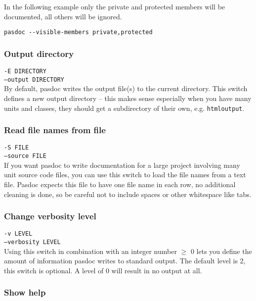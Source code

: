\documentclass[11pt]{article}
\begin{document}
In the following example only the private and protected members
will be documented, all others will be ignored.

\begin{verbatim}
pasdoc --visible-members private,protected
\end{verbatim}

\subsubsection{Output directory}

{\tt -E DIRECTORY}\\
{\tt --output DIRECTORY}\\

By default, pasdoc writes the output file(s) to the current directory.
This switch defines a new output directory -- this makes sense
especially when you have many units and classes, they should get
a subdirectory of their own, e.g. {\tt htmloutput}.

\subsubsection{Read file names from file}

{\tt -S FILE}\\
{\tt --source FILE}\\

If you want pasdoc to write documentation for a large project involving many
unit source code files, you can use this switch to load the file names from
a text file.
Pasdoc expects this file to have one file name in each row, no additional
cleaning is done, so be careful not to include spaces or other whitespace
like tabs.

\subsubsection{Change verbosity level}

{\tt -v LEVEL}\\
{\tt --verbosity LEVEL}\\

Using this switch in combination with an integer number $\geq$ 0 lets you
define the amount of information pasdoc writes to standard output.
The default level is 2, this switch is optional.
A level of 0 will result in no output at all.

\subsubsection{Show help}
\end{document}
